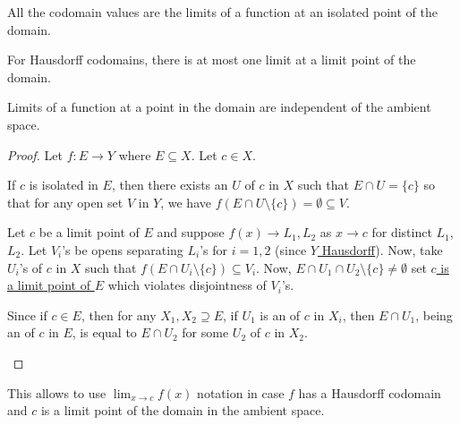 	\begin{lem}\label{LEM: lims at isolated and lim pts}
		\begin{mylist}
			\item\label{LEMi: lims at isolated and lim pts} All the codomain values are the limits of a function at an isolated point of the domain.
			
			\item\label{LEMii: lims at isolated and lim pts} For Hausdorff codomains, there is at most one limit at a limit point of the domain.
			
			\item\label{LEMiii: lims at isolated and lim pts} Limits of a function at a point in the domain are independent of the ambient space.
		\end{mylist}
	\end{lem}
	
	\begin{proof}
		Let $f\colon E\to Y$ where $E\subseteq X$. Let $c\in X$.
		\begin{mylist}
			\item If $c$ is isolated in $E$, then there exists an \onbd $U$ of $c$ in $X$ such that $E\cap U = \{c\}$ so that for any open set $V$ in $Y$, we have $f(E\cap U\setminus\{c\}) = \emptyset\subseteq V$.
			
			\item Let $c$ be a limit point of $E$ and suppose $f(x)\to L_1, L_2$ as $x\to c$ for distinct $L_1$, $L_2$. Let $V_i$'s be opens separating $L_i$'s for $i = 1, 2$ (since \uline{$Y$ Hausdorff}). Now, take  $U_i$'s of $c$ in $X$ such that $f(E\cap U_i\setminus\{c\})\subseteq V_i$. Now, $E\cap U_1\cap U_2\setminus\{c\}\ne\emptyset$ set \uline{$c$ is a limit point of $E$} which violates disjointness of $V_i$'s.
			
			\item Since if $c\in E$, then for any $X_1, X_2\supseteq E$, if $U_1$ is an \onbd of $c$ in $X_i$, then $E\cap U_1$, being an \onbd of $c$ in $E$, is equal to $E\cap U_2$ for some \onbd $U_2$ of $c$ in $X_2$.\qedhere
		\end{mylist}
	\end{proof}
	
	\begin{rmk}
		This allows to use $\lim_{x\to c} f(x)$ notation in case $f$ has a Hausdorff codomain and $c$ is a limit point of the domain in the ambient space.
	\end{rmk}
	
